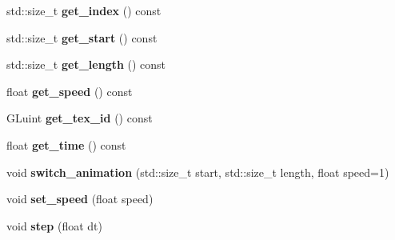 \begin{DoxyCompactItemize}
\item 
\mbox{\label{classnta_1_1Animation2D_ac446522438b03f14a532907ba5c3d5af}} 
std\+::size\+\_\+t {\bfseries get\+\_\+index} () const
\item 
\mbox{\label{classnta_1_1Animation2D_a27647ebb0767d114b3330d784be76659}} 
std\+::size\+\_\+t {\bfseries get\+\_\+start} () const
\item 
\mbox{\label{classnta_1_1Animation2D_a879e528e64c38508ecab2dfff935d5d9}} 
std\+::size\+\_\+t {\bfseries get\+\_\+length} () const
\item 
\mbox{\label{classnta_1_1Animation2D_ac9848d72d81b4391bffc40473bb6556e}} 
float {\bfseries get\+\_\+speed} () const
\item 
\mbox{\label{classnta_1_1Animation2D_a0ad6c0188e2b36f42caf1817537ec483}} 
G\+Luint {\bfseries get\+\_\+tex\+\_\+id} () const
\item 
\mbox{\label{classnta_1_1Animation2D_aa0aae6f2c69f9edb1e5f0dc35a440e48}} 
float {\bfseries get\+\_\+time} () const
\item 
\mbox{\label{classnta_1_1Animation2D_aa5de467f16ecc3851bcfbf1da68a6103}} 
void {\bfseries switch\+\_\+animation} (std\+::size\+\_\+t start, std\+::size\+\_\+t length, float speed=1)
\item 
\mbox{\label{classnta_1_1Animation2D_ab22616e5abdf38980404a711503f1b99}} 
void {\bfseries set\+\_\+speed} (float speed)
\item 
\mbox{\label{classnta_1_1Animation2D_a3bc6f94232a04f3302ab5670ab46be44}} 
void {\bfseries step} (float dt)
\end{DoxyCompactItemize}
